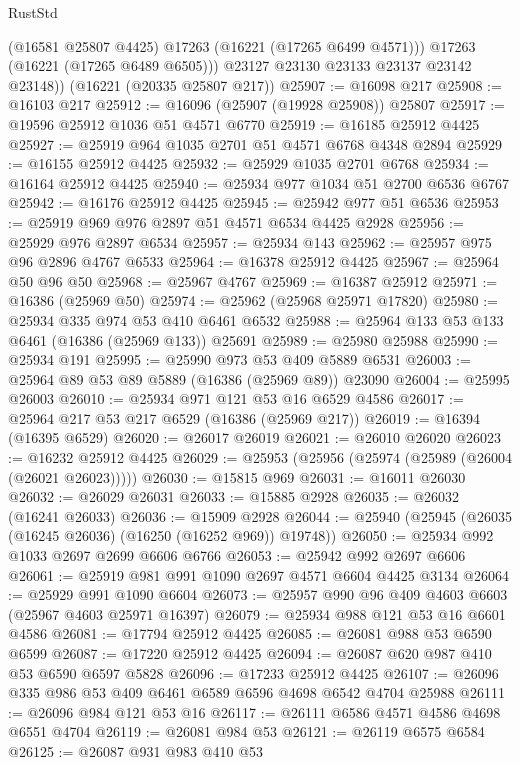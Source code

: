 \begin{lexlean}{RustStd}
\begin{coremodule}
            (@16581 @25807 @4425)
            @17263
            (@16221 (@17265 @6499 @4571)))
          @17263
          (@16221 (@17265 @6489 @6505)))
        @23127
        @23130
        @23133
        @23137
        @23142
        @23148))
    (@16221 (@20335 @25807 @217))
@25907 := @16098 @217
@25908 := @16103 @217
@25912 := @16096 (@25907 (@19928 @25908)) @25807
@25917 := @19596 @25912 @1036 @51 @4571 @6770
@25919 := @16185 @25912 @4425
@25927 := @25919 @964 @1035 @2701 @51 @4571 @6768 @4348 @2894
@25929 := @16155 @25912 @4425
@25932 := @25929 @1035 @2701 @6768
@25934 := @16164 @25912 @4425
@25940 := @25934 @977 @1034 @51 @2700 @6536 @6767
@25942 := @16176 @25912 @4425
@25945 := @25942 @977 @51 @6536
@25953 := @25919 @969 @976 @2897 @51 @4571 @6534 @4425 @2928
@25956 := @25929 @976 @2897 @6534
@25957 := @25934 @143
@25962 := @25957 @975 @96 @2896 @4767 @6533
@25964 := @16378 @25912 @4425
@25967 := @25964 @50 @96 @50
@25968 := @25967 @4767
@25969 := @16387 @25912
@25971 := @16386 (@25969 @50)
@25974 := @25962 (@25968 @25971 @17820)
@25980 := @25934 @335 @974 @53 @410 @6461 @6532
@25988 := @25964 @133 @53 @133 @6461 (@16386 (@25969 @133)) @25691
@25989 := @25980 @25988
@25990 := @25934 @191
@25995 := @25990 @973 @53 @409 @5889 @6531
@26003 := @25964 @89 @53 @89 @5889 (@16386 (@25969 @89)) @23090
@26004 := @25995 @26003
@26010 := @25934 @971 @121 @53 @16 @6529 @4586
@26017 := @25964 @217 @53 @217 @6529 (@16386 (@25969 @217))
@26019 := @16394 (@16395 @6529)
@26020 := @26017 @26019
@26021 := @26010 @26020
@26023 := @16232 @25912 @4425
@26029 := @25953 (@25956 (@25974 (@25989 (@26004 (@26021 @26023)))))
@26030 := @15815 @969
@26031 := @16011 @26030
@26032 := @26029 @26031
@26033 := @15885 @2928
@26035 := @26032 (@16241 @26033)
@26036 := @15909 @2928
@26044 := @25940 (@25945 (@26035 (@16245 @26036) (@16250 (@16252 @969)) @19748))
@26050 := @25934 @992 @1033 @2697 @2699 @6606 @6766
@26053 := @25942 @992 @2697 @6606
@26061 := @25919 @981 @991 @1090 @2697 @4571 @6604 @4425 @3134
@26064 := @25929 @991 @1090 @6604
@26073 := @25957 @990 @96 @409 @4603 @6603 (@25967 @4603 @25971 @16397)
@26079 := @25934 @988 @121 @53 @16 @6601 @4586
@26081 := @17794 @25912 @4425
@26085 := @26081 @988 @53 @6590 @6599
@26087 := @17220 @25912 @4425
@26094 := @26087 @620 @987 @410 @53 @6590 @6597 @5828
@26096 := @17233 @25912 @4425
@26107 := @26096 @335 @986 @53 @409 @6461 @6589 @6596 @4698 @6542 @4704 @25988
@26111 := @26096 @984 @121 @53 @16
@26117 := @26111 @6586 @4571 @4586 @4698 @6551 @4704
@26119 := @26081 @984 @53
@26121 := @26119 @6575 @6584
@26125 := @26087 @931 @983 @410 @53

\end{coremodule}
\end{lexlean}
